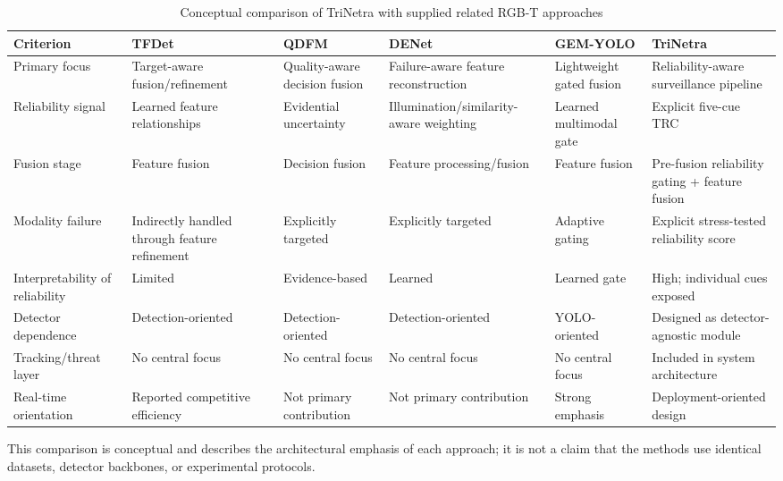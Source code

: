 \documentclass[conference]{IEEEtran}
\begin{document}
\begin{table}[!t]
\centering
\caption{Conceptual comparison of TriNetra with supplied related RGB-T approaches}
\label{tab:relatedcomparison}
\footnotesize
\begin{tabular}{p{}p{}p{}p{}p{}p{}}
\toprule
\textbf{Criterion} & \textbf{TFDet} & \textbf{QDFM} & \textbf{DENet} & \textbf{GEM-YOLO} & \textbf{TriNetra}\\
\midrule
Primary focus & Target-aware fusion/refinement & Quality-aware decision fusion & Failure-aware feature reconstruction & Lightweight gated fusion & Reliability-aware surveillance pipeline\\
Reliability signal & Learned feature relationships & Evidential uncertainty & Illumination/similarity-aware weighting & Learned multimodal gate & Explicit five-cue TRC\\
Fusion stage & Feature fusion & Decision fusion & Feature processing/fusion & Feature fusion & Pre-fusion reliability gating + feature fusion\\
Modality failure & Indirectly handled through feature refinement & Explicitly targeted & Explicitly targeted & Adaptive gating & Explicit stress-tested reliability score\\
Interpretability of reliability & Limited & Evidence-based & Learned & Learned gate & High; individual cues exposed\\
Detector dependence & Detection-oriented & Detection-oriented & Detection-oriented & YOLO-oriented & Designed as detector-agnostic module\\
Tracking/threat layer & No central focus & No central focus & No central focus & No central focus & Included in system architecture\\
Real-time orientation & Reported competitive efficiency & Not primary contribution & Not primary contribution & Strong emphasis & Deployment-oriented design\\
\bottomrule
\end{tabular}
\end{table}

This comparison is conceptual and describes the architectural emphasis of each approach; it is not a claim that the methods use identical datasets, detector backbones, or experimental protocols.

\end{document}
